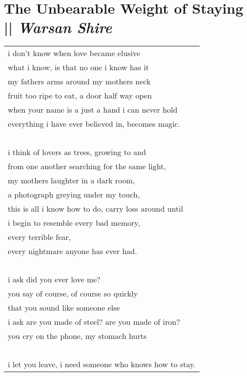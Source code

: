 \section[The Unbearable Weight of Staying]{The Unbearable Weight of Staying || \emph{Warsan Shire} \hspace*{\fill}  \thepage}
\label{sec:The_Unbearable_Weight_of_Staying.tex}
\hspace{0pt}
\vfill
\begin{center}
\begin{tabular}{l}
i don’t know when love became elusive\\
what i know, is that no one i know has it\\
my fathers arms around my mothers neck\\
fruit too ripe to eat, a door half way open\\
when your name is a just a hand i can never hold\\
everything i have ever believed in, becomes magic.\\
\-\ \\
i think of lovers as trees, growing to and\\
from one another searching for the same light,\\
my mothers laughter in a dark room,\\
a photograph greying under my touch,\\
this is all i know how to do, carry loss around until\\
i begin to resemble every bad memory,\\
every terrible fear,\\
every nightmare anyone has ever had.\\
\-\ \\
i ask did you ever love me?\\
you say of course, of course so quickly\\
that you sound like someone else\\
i ask are you made of steel? are you made of iron?\\
you cry on the phone, my stomach hurts\\
\-\ \\
i let you leave, i need someone who knows how to stay.
\end{tabular}
\end{center}
\vfill
\hspace{0pt}